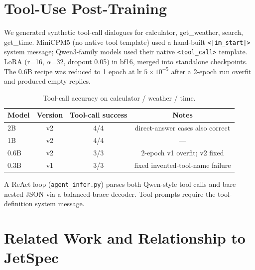 \documentclass[11pt,a4paper]{article}
\begin{document}
\section{Tool-Use Post-Training}
We generated synthetic tool-call dialogues for calculator, get\_weather, search, get\_time.
MiniCPM5 (no native tool template) used a hand-built \texttt{<|im\_start|>} system message;
Qwen3-family models used their native \texttt{<tool\_call>} template. LoRA (r=16, $\alpha$=32,
dropout 0.05) in bf16, merged into standalone checkpoints. The 0.6B recipe was reduced to 1
epoch at lr $5\times10^{-5}$ after a 2-epoch run overfit and produced empty replies.
\begin{table}[h]
\centering
\begin{tabular}{lccc}
\toprule
Model & Version & Tool-call success & Notes\\
\midrule
2B & v2 & 4/4 & direct-answer cases also correct\\
1B & v2 & 4/4 & ---\\
0.6B & v2 & 3/3 & 2-epoch v1 overfit; v2 fixed\\
0.3B & v1 & 3/3 & fixed invented-tool-name failure\\
\bottomrule
\end{tabular}
\caption{Tool-call accuracy on calculator / weather / time.}
\end{table}
A ReAct loop (\texttt{agent\_infer.py}) parses both Qwen-style tool calls and bare nested JSON
via a balanced-brace decoder. Tool prompts require the tool-definition system message.

\section{Related Work and Relationship to JetSpec}
\end{document}
